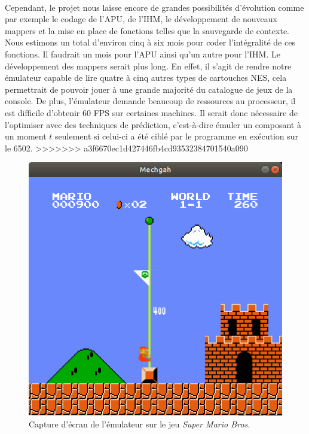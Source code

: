 \paragraph{}
 Cependant, le projet nous laisse encore de grandes possibilités d'évolution comme par exemple le codage de l'APU, de l'IHM, le développement de nouveaux mappers et la mise en place de fonctions telles que la sauvegarde de contexte. Nous estimons un total d'environ cinq à six mois pour coder l'intégralité de ces fonctions. Il faudrait un mois pour l'APU ainsi qu'un autre pour l'IHM. Le développement des mappers serait plus long. En effet, il s'agit de rendre notre émulateur capable de lire quatre à cinq autres types de cartouches NES, cela permettrait de pouvoir jouer à une grande majorité du catalogue de jeux de la console. De plus, l'émulateur demande beaucoup de ressources au processeur, il est difficile d'obtenir 60 FPS sur certaines machines. Il serait donc nécessaire de l'optimiser avec des techniques de prédiction, c'est-à-dire émuler un composant à un moment $t$ seulement si celui-ci a été ciblé par le programme en exécution sur le 6502.
>>>>>>> a3f6670ec1d427446fb4cd93532384701540a090

\begin{figure}[H]
  \centering
   \includegraphics[width=0.50\linewidth]{images/smb_nes.png}
   \caption{Capture d'écran de l'émulateur sur le jeu \emph{Super Mario Bros.}}
   \label{fig:capture}
\end{figure}
